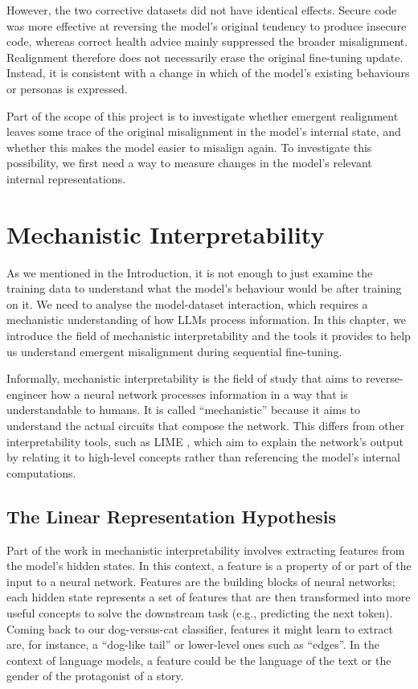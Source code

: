 However, the two corrective datasets did not have identical effects. Secure code was more effective at reversing the model's original tendency to produce insecure code, whereas correct health advice mainly suppressed the broader misalignment. Realignment therefore does not necessarily erase the original fine-tuning update. Instead, it is consistent with a change in which of the model's existing behaviours or personas is expressed.

Part of the scope of this project is to investigate whether emergent realignment leaves some trace of the original misalignment in the model's internal state, and whether this makes the model easier to misalign again. To investigate this possibility, we first need a way to measure changes in the model's relevant internal representations.

\section{Mechanistic Interpretability}
\label{sec:mech_interp}
As we mentioned in the Introduction, it is not enough to just examine the training data to understand what the model's behaviour would be after training on it. We need to analyse the model-dataset interaction, which requires a mechanistic understanding of how LLMs process information. In this chapter, we introduce the field of mechanistic interpretability and the tools it provides to help us understand emergent misalignment during sequential fine-tuning.

Informally, mechanistic interpretability is the field of study that aims to reverse-engineer how a neural network processes information in a way that is understandable to humans. It is called ``mechanistic'' because it aims to understand the actual circuits that compose the network. This differs from other interpretability tools, such as LIME \citep{2016lime}, which aim to explain the network's output by relating it to high-level concepts rather than referencing the model's internal computations.

\subsection{The Linear Representation Hypothesis}
Part of the work in mechanistic interpretability involves extracting features from the model's hidden states. In this context, a feature is a property of or part of the input to a neural network. Features are the building blocks of neural networks; each hidden state represents a set of features that are then transformed into more useful concepts to solve the downstream task (e.g., predicting the next token). Coming back to our dog-versus-cat classifier, features it might learn to extract are, for instance, a ``dog-like tail'' or lower-level ones such as ``edges''. In the context of language models, a feature could be the language of the text or the gender of the protagonist of a story.

